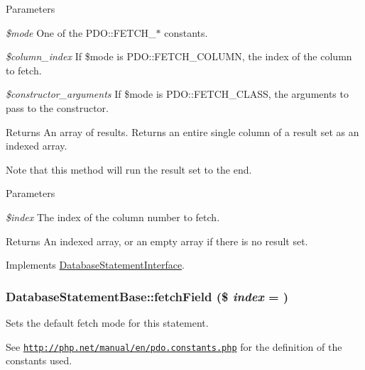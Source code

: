 \begin{DoxyParams}{Parameters}
\item[{\em \$mode}]One of the PDO::FETCH\_\-$\ast$ constants. \item[{\em \$column\_\-index}]If \$mode is PDO::FETCH\_\-COLUMN, the index of the column to fetch. \item[{\em \$constructor\_\-arguments}]If \$mode is PDO::FETCH\_\-CLASS, the arguments to pass to the constructor.\end{DoxyParams}
\begin{DoxyReturn}{Returns}
An array of results. Returns an entire single column of a result set as an indexed array.
\end{DoxyReturn}
Note that this method will run the result set to the end.


\begin{DoxyParams}{Parameters}
\item[{\em \$index}]The index of the column number to fetch.\end{DoxyParams}
\begin{DoxyReturn}{Returns}
An indexed array, or an empty array if there is no result set. 
\end{DoxyReturn}


Implements \hyperlink{interfaceDatabaseStatementInterface_a1c66bf4ef84ffd4710fa6545974cdf23}{DatabaseStatementInterface}.\hypertarget{classDatabaseStatementBase_ad80ef261e8934f5c69422f7530aa4cdc}{
\subsubsection[{fetchField}]{\setlength{\rightskip}{0pt plus 5cm}DatabaseStatementBase::fetchField (\$ {\em index} = {})}}
\label{classDatabaseStatementBase_ad80ef261e8934f5c69422f7530aa4cdc}
Sets the default fetch mode for this statement.

See \href{http://php.net/manual/en/pdo.constants.php}{\tt http://php.net/manual/en/pdo.constants.php} for the definition of the constants used.


